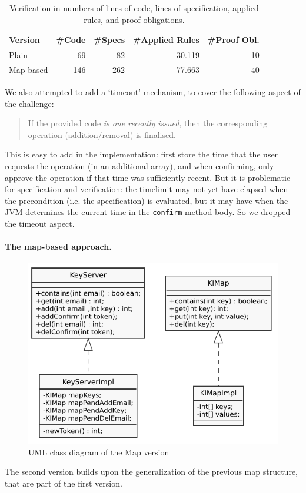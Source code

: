 \documentclass{llncs}
\begin{document}
\begin{table}[t]
  \caption{Verification in numbers of lines of code, lines of specification,
    applied rules, and proof obligations.}
  \centering
  \begin{tabular}{ lrrrr }
    Version    & \#Code & \#Specs & \#Applied Rules &\#Proof Obl. \\
    \toprule
    Plain & 69 & 82 & 30.119 & 10 \\
    Map-based & 146 & 262 & 77.663  & 40 \\
    \bottomrule
  \end{tabular}
  \label{fig:numbers}
\end{table}




We also attempted to add a `timeout' mechanism, to cover the following aspect of
the challenge:
\begin{quote}
  If the provided code \emph{is one recently issued}, then the corresponding
  operation (addition/removal) is finalised.
\end{quote}
This is easy to add in the implementation: first store the time that
the user requests the operation (in an additional array), and when
confirming, only approve the operation if that time was sufficiently
recent. But it is problematic for specification and verification: the
timelimit may not yet have elapsed when the precondition (i.e. the
specification) is evaluated, but it may have when the JVM determines
the current time in the \verb|confirm| method body. So we dropped the
timeout aspect.

\paragraph{The map-based approach.}

\begin{figure}
  \centering
  \includegraphics[width=.5\textwidth]{uml}
  \caption{UML class diagram of the Map version}
  \label{fig:umlclassdiagram}
\end{figure}
%
The second version builds upon the generalization of the previous map structure,
that are part of the first version.
\end{document}
